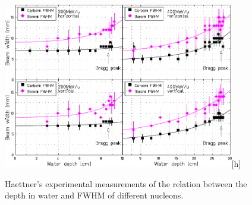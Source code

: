 


\begin{figure}[h] 
\begin{center}
\includegraphics[width=0.9\textwidth]{images/haettner48.png}[h]  
\caption{\label{fig:haettner48} Haettner's experimental measurements of the relation between the depth in water and FWHM of different nucleons.}
 \end{center}
 \end{figure}

